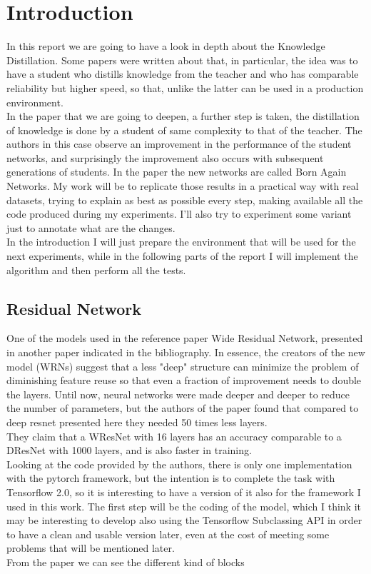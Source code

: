 \section{Introduction}
In this report we are going to have a look in depth about the Knowledge Distillation. Some papers were written about that, in particular, the idea was to have a student who distills knowledge from the teacher and who has comparable reliability but higher speed, so that, unlike the latter can be used in a production environment.\\
In the paper\cite{ban} that we are going to deepen, a further step is taken, the distillation of knowledge is done by a student of same complexity to that of the teacher. The authors in this case observe an improvement in the performance of the student networks, and surprisingly the improvement also occurs with subsequent generations of students. In the paper the new networks are called Born Again Networks.
My work will be to replicate those results in a practical way with real datasets, trying to explain as best as possible every step, making available all the code produced during my experiments. I'll also try to 
experiment some variant just to annotate what are the changes.\\
In the introduction I will just prepare the environment that will be used for the next experiments, while in the following parts of the report I will implement the algorithm and then perform all the tests.

\subsection{Residual Network}
One of the models used in the reference paper Wide Residual Network, presented in another paper indicated in the bibliography\cite{wresnet}. In essence, the creators of the new model (WRNs) suggest that a less "deep" structure can minimize the problem of diminishing feature reuse so that even a fraction of improvement needs to double the layers. Until now, neural networks were made deeper and deeper to reduce the number of parameters, but the authors of the paper found that compared to deep resnet presented here \cite{deepresnet} they needed 50 times less layers.\\
They claim that a WResNet with 16 layers has an accuracy comparable to a DResNet with 1000 layers, and is also faster in training.\\
Looking at the code provided by the authors, there is only one implementation with the pytorch framework, but the intention is to complete the task with 
Tensorflow 2.0, so it is interesting to have a version of it also for the framework I used in this work.
\newpage
The first step will be the coding of the model, which I think it may be interesting to develop also using the Tensorflow Subclassing API in order to have a clean and usable version later, even at the cost of meeting some problems that will be mentioned later.\\
From the paper\cite{wresnet} we can see the different kind of blocks\\

